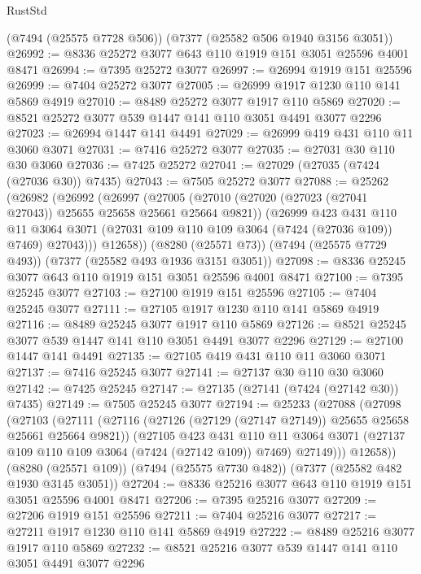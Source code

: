 \begin{lexlean}{RustStd}
\begin{coremodule}
    (@7494 (@25575 @7728 @506))
    (@7377 (@25582 @506 @1940 @3156 @3051))
@26992 := @8336 @25272 @3077 @643 @110 @1919 @151 @3051 @25596 @4001 @8471
@26994 := @7395 @25272 @3077
@26997 := @26994 @1919 @151 @25596
@26999 := @7404 @25272 @3077
@27005 := @26999 @1917 @1230 @110 @141 @5869 @4919
@27010 := @8489 @25272 @3077 @1917 @110 @5869
@27020 := @8521 @25272 @3077 @539 @1447 @141 @110 @3051 @4491 @3077 @2296
@27023 := @26994 @1447 @141 @4491
@27029 := @26999 @419 @431 @110 @11 @3060 @3071
@27031 := @7416 @25272 @3077
@27035 := @27031 @30 @110 @30 @3060
@27036 := @7425 @25272
@27041 := @27029 (@27035 (@7424 (@27036 @30)) @7435)
@27043 := @7505 @25272 @3077
@27088 := @25262
    (@26982
      (@26992
        (@26997
          (@27005
            (@27010 (@27020 (@27023 (@27041 @27043)) @25655 @25658 @25661 @25664 @9821))
            (@26999
              @423
              @431
              @110
              @11
              @3064
              @3071
              (@27031 @109 @110 @109 @3064 (@7424 (@27036 @109)) @7469)
              @27043)))
        @12658))
    (@8280 (@25571 @73))
    (@7494 (@25575 @7729 @493))
    (@7377 (@25582 @493 @1936 @3151 @3051))
@27098 := @8336 @25245 @3077 @643 @110 @1919 @151 @3051 @25596 @4001 @8471
@27100 := @7395 @25245 @3077
@27103 := @27100 @1919 @151 @25596
@27105 := @7404 @25245 @3077
@27111 := @27105 @1917 @1230 @110 @141 @5869 @4919
@27116 := @8489 @25245 @3077 @1917 @110 @5869
@27126 := @8521 @25245 @3077 @539 @1447 @141 @110 @3051 @4491 @3077 @2296
@27129 := @27100 @1447 @141 @4491
@27135 := @27105 @419 @431 @110 @11 @3060 @3071
@27137 := @7416 @25245 @3077
@27141 := @27137 @30 @110 @30 @3060
@27142 := @7425 @25245
@27147 := @27135 (@27141 (@7424 (@27142 @30)) @7435)
@27149 := @7505 @25245 @3077
@27194 := @25233
    (@27088
      (@27098
        (@27103
          (@27111
            (@27116 (@27126 (@27129 (@27147 @27149)) @25655 @25658 @25661 @25664 @9821))
            (@27105
              @423
              @431
              @110
              @11
              @3064
              @3071
              (@27137 @109 @110 @109 @3064 (@7424 (@27142 @109)) @7469)
              @27149)))
        @12658))
    (@8280 (@25571 @109))
    (@7494 (@25575 @7730 @482))
    (@7377 (@25582 @482 @1930 @3145 @3051))
@27204 := @8336 @25216 @3077 @643 @110 @1919 @151 @3051 @25596 @4001 @8471
@27206 := @7395 @25216 @3077
@27209 := @27206 @1919 @151 @25596
@27211 := @7404 @25216 @3077
@27217 := @27211 @1917 @1230 @110 @141 @5869 @4919
@27222 := @8489 @25216 @3077 @1917 @110 @5869
@27232 := @8521 @25216 @3077 @539 @1447 @141 @110 @3051 @4491 @3077 @2296

\end{coremodule}
\end{lexlean}

